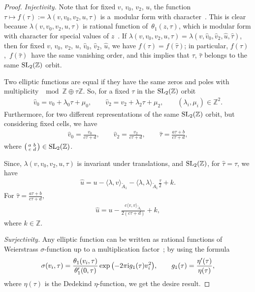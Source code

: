 \documentclass[pdftex]{sigma}%
\numberwithin{equation}{section}
\begin{document}
\begin{proof}
\textit{Injectivity.} Note that for fixed $v$, $v_0$, $v_2$, $u$, the function $\tau\mapsto f(\tau):=\lambda(v,v_0,v_2,u,\tau)$ is a~modu\-lar form with character~\cite{M.EichlerandD.Zagier}. This is clear because $\lambda(v,v_0,v_2,u,\tau)$ is rational function of~$\theta_1(z,\tau)$, which is modular form with character for special values of $z$~\cite{M.EichlerandD.Zagier}.
If $\lambda(v,v_0,v_2,u,\tau) =\lambda(v,\hat v_0,\hat v_2, \hat u, \hat \tau)$, then for fixed $v$, $v_0$, $v_2$, $u$, $\hat v_0$, $\hat v_2$, $\hat u$, we have $f(\tau)=f(\hat \tau)$; in particular, $f(\tau)$,~$f(\hat \tau)$~have the same vanishing order, and this implies that $\tau$, $\hat \tau$ belongs to the same ${\rm SL}_2(\mathbb{Z})$ orbit.

{\samepage
Two elliptic functions are equal if they have the same zeros and poles with multiplicity $\mod \mathbb{Z}\oplus \tau\mathbb{Z}$. So, for a fixed $\tau$ in the ${\rm SL}_2(\mathbb{Z})$ orbit
\begin{gather*}
\hat v_0=v_0+\lambda_0\tau+\mu_0,\qquad
\hat v_2=v_2+\lambda_2\tau+\mu_2,\qquad
(\lambda_i,\mu_i)\in \mathbb{Z}^2.
\end{gather*}
Furthermore, for two different representations of the same ${\rm SL}_2(\mathbb{Z})$ orbit, but considering fixed cells, we have
\begin{gather*}
\hat v_0=\frac{v_0}{c\tau+d},\qquad
\hat v_2=\frac{v_2}{c\tau+d},\qquad
\hat \tau=\frac{a\tau+b}{c\tau+d},
\end{gather*}
where $\left(\begin{smallmatrix}
a & b \\
c & d
\end{smallmatrix}\right)\in {\rm SL}_2(\mathbb{Z})$.

}

Since, $\lambda(v,v_0,v_2,u,\tau)$ is invariant under translations, and ${\rm SL}_2(\mathbb{Z})$, for $\hat\tau=\tau$, we have
\begin{gather*}
\hat u=u-\langle \lambda,v\rangle_{\tilde A_1}-\langle \lambda, \lambda \rangle_{\tilde A_1}\frac{\tau}{2}+k.
\end{gather*}
For $\hat \tau=\frac{a\tau+b}{c\tau+d}$,
\begin{gather*}
\hat u=u-\frac{c\langle v, v \rangle_{\tilde A_1}}{2(c\tau+d)}+k,
\end{gather*}
where $k\in \mathbb{Z}$.

\textit{Surjectivity.}
 Any elliptic function can be written as rational functions of Weierstrass $\sigma$-function up to a multiplication factor~\cite{E.T.WhittakerandG.N.Watson}; by using the formula
\begin{gather*}
\sigma(v_i,\tau)=\frac{\theta_1(v_i,\tau)}{\theta_1^{\prime}(0,\tau)}\exp\big({-}2\pi {\rm i}g_1(\tau)v_i^2\big),\qquad
g_1(\tau)=\frac{\eta^{\prime}(\tau)}{\eta(\tau)},
\end{gather*}
where $\eta(\tau)$ is the Dedekind $\eta$-function, we get the desire result.
\end{proof}
\end{document}
